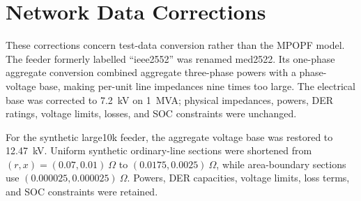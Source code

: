 \section{Network Data Corrections}
\label{app:network_corrections}

These corrections concern test-data conversion rather than the MPOPF model.
The feeder formerly labelled ``ieee2552'' was renamed med2522. Its
one-phase aggregate conversion combined aggregate three-phase powers with a
phase-voltage base, making per-unit line impedances nine times too large. The
electrical base was corrected to 7.2~kV on 1~MVA; physical impedances, powers,
DER ratings, voltage limits, losses, and SOC constraints were unchanged.

For the synthetic large10k feeder, the aggregate voltage base was restored to
12.47~kV. Uniform synthetic ordinary-line sections were shortened from
$(r,x)=(0.07,0.01)~\Omega$ to $(0.0175,0.0025)~\Omega$, while area-boundary
sections use $(0.000025,0.000025)~\Omega$. Powers, DER capacities, voltage
limits, loss terms, and SOC constraints were retained.
